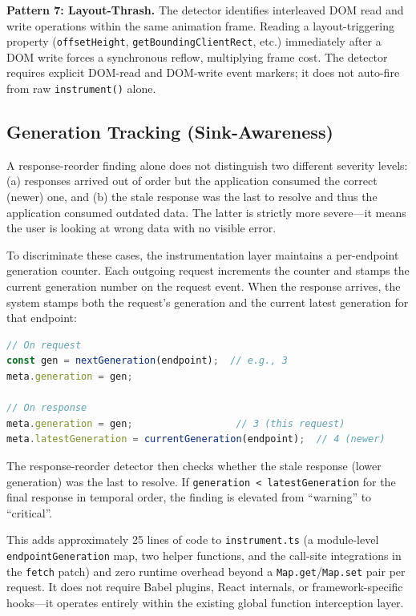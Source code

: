 \documentclass[11pt,a4paper]{article}
\begin{document}
\textbf{Pattern 7: Layout-Thrash.} The detector identifies interleaved DOM read and write operations within the same animation frame. Reading a layout-triggering property (\texttt{offsetHeight}, \texttt{getBoundingClientRect}, etc.) immediately after a DOM write forces a synchronous reflow, multiplying frame cost. The detector requires explicit DOM-read and DOM-write event markers; it does not auto-fire from raw \texttt{instrument()} alone.

\subsection{Generation Tracking (Sink-Awareness)}

A response-reorder finding alone does not distinguish two different severity levels: (a) responses arrived out of order but the application consumed the correct (newer) one, and (b) the stale response was the last to resolve and thus the application consumed outdated data. The latter is strictly more severe---it means the user is looking at wrong data with no visible error.

To discriminate these cases, the instrumentation layer maintains a per-endpoint generation counter. Each outgoing request increments the counter and stamps the current generation number on the request event. When the response arrives, the system stamps both the request's generation and the current latest generation for that endpoint:

\begin{lstlisting}[language=TypeScript]
// On request
const gen = nextGeneration(endpoint);  // e.g., 3
meta.generation = gen;

// On response
meta.generation = gen;                  // 3 (this request)
meta.latestGeneration = currentGeneration(endpoint);  // 4 (newer)
\end{lstlisting}

The response-reorder detector then checks whether the stale response (lower generation) was the last to resolve. If \texttt{generation < latestGeneration} for the final response in temporal order, the finding is elevated from ``warning'' to ``critical''.

This adds approximately 25 lines of code to \texttt{instrument.ts} (a module-level \texttt{endpointGeneration} map, two helper functions, and the call-site integrations in the \texttt{fetch} patch) and zero runtime overhead beyond a \texttt{Map.get}/\texttt{Map.set} pair per request. It does not require Babel plugins, React internals, or framework-specific hooks---it operates entirely within the existing global function interception layer.
\end{document}
